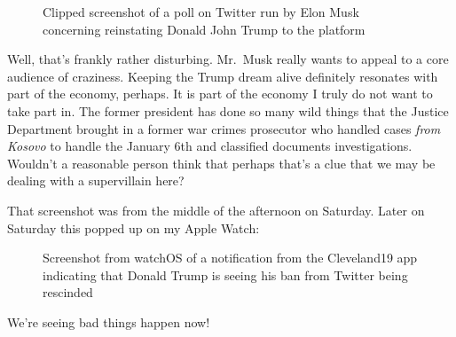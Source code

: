 \begin{figure}
\centering
{}
\caption{Clipped screenshot of a poll on Twitter run by Elon Musk
concerning reinstating Donald John Trump to the platform}
\end{figure}

Well, that's frankly rather disturbing. Mr.~Musk really wants to appeal
to a core audience of craziness. Keeping the Trump dream alive
definitely resonates with part of the economy, perhaps. It is part of
the economy I truly do not want to take part in. The former president
has done so many wild things that the Justice Department brought in a
former war crimes prosecutor who handled cases \emph{from Kosovo} to
handle the January 6th and classified documents investigations. Wouldn't
a reasonable person think that perhaps that's a clue that we may be
dealing with a supervillain here?

That screenshot was from the middle of the afternoon on Saturday. Later
on Saturday this popped up on my Apple Watch:

\begin{figure}
\centering
{}
\caption{Screenshot from watchOS of a notification from the Cleveland19
app indicating that Donald Trump is seeing his ban from Twitter being
rescinded}
\end{figure}

We're seeing bad things happen now!
